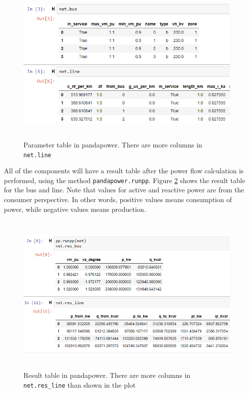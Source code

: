 \documentclass[class=book, crop=false, 11pt]{standalone}
\begin{document}
\begin{figure}[H]
    \includegraphics[height=8cm, width=13.5cm]{figures/case4g_line_bus.PNG}
    \caption[size = 9]{Parameter table in pandapower. There are more columns in \texttt{net.line}}
    \label{fig:method:line_bus_dataframe}
\end{figure}
All of the components will have a result table after the power flow calculation is performed, using the method \texttt{pandapower.runpp}. Figure \ref{fig:method:res_line_bus_dataframe} shows the result table for the bus and line. Note that values for active and reactive power are from the consumer perspective. In other words, positive values means consumption of power, while negative values means production.

\begin{figure}[H]
    \includegraphics[height=8cm, width=14cm]{figures/case4g_line_bus_res.PNG}
    \caption[size = 9]{Result table in pandapower. There are more columns in \texttt{net.res\_line} than shown in the plot}
    \label{fig:method:res_line_bus_dataframe}
\end{figure}
\end{document}
